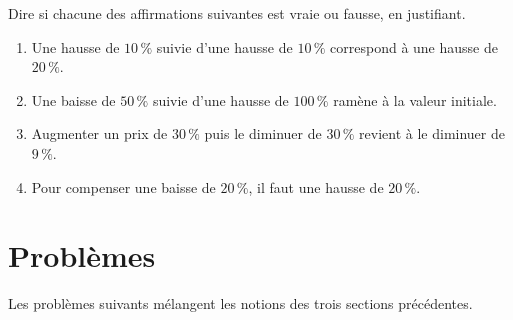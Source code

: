 \documentclass[10pt,a4paper]{article}
\begin{document}
\begin{bloc}
\begin{exo}
Dire si chacune des affirmations suivantes est vraie ou fausse, en justifiant.
\begin{enumerate}[leftmargin=*]
    \item Une hausse de \(10\,\%\) suivie d'une hausse de \(10\,\%\) correspond à une hausse de \(20\,\%\).
    \item Une baisse de \(50\,\%\) suivie d'une hausse de \(100\,\%\) ramène à la valeur initiale.
    \item Augmenter un prix de \(30\,\%\) puis le diminuer de \(30\,\%\) revient à le diminuer de \(9\,\%\).
    \item Pour compenser une baisse de \(20\,\%\), il faut une hausse de \(20\,\%\).
\end{enumerate}
\end{exo}
\end{bloc}


\section{Problèmes}

Les problèmes suivants mélangent les notions des trois sections précédentes.
\nopagebreak
\end{document}
